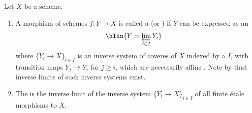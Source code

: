 \begin{definition} \label{definition:profinite_etale_cover_of_schemes}
Let $X$ be a scheme. 
\begin{enumerate}
    \item A morphism of schemes $f \colon Y \to X$ is called a  (or ) if $Y$ can be expressed as an 
    $$\hlin{Y = \varprojlim_{i \in I} Y_i}$$
    where $\{Y_i \to X\}_{i \in I}$ is an inverse system of  coveres of $X$ indexed by a  $I$, with  transition maps $Y_j \to Y_i$ for $j \geq i$, which are necessarily affine . 
    Note by  that inverse limits of such inverse systems exist.

    \item The  is the inverse limit of the inverse system $\{Y_i \to X\}_{i \in I}$ of all finite \'etale morphisms to $X$. 
\end{enumerate}
\end{definition}
